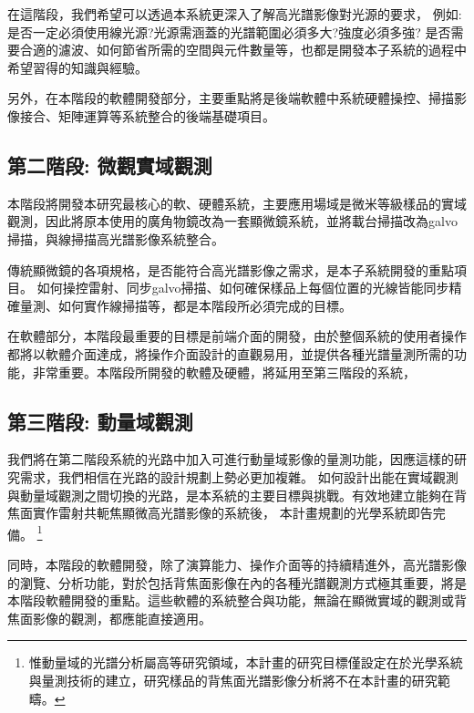 \documentclass[12pt]{article}
\begin{document}
在這階段，我們希望可以透過本系統更深入了解高光譜影像對光源的要求，
例如: 是否一定必須使用線光源?光源需涵蓋的光譜範圍必須多大?強度必須多強?
是否需要合適的濾波、如何節省所需的空間與元件數量等，也都是開發本子系統的過程中希望習得的知識與經驗。

另外，在本階段的軟體開發部分，主要重點將是後端軟體中系統硬體操控、掃描影像接合、矩陣運算等系統整合的後端基礎項目。
\subsection{第二階段: 微觀實域觀測} \label{microreal}
本階段將開發本研究最核心的軟、硬體系統，主要應用場域是微米等級樣品的實域觀測，因此將原本使用的廣角物鏡改為一套顯微鏡系統，並將載台掃描改為galvo掃描，與線掃描高光譜影像系統整合。

傳統顯微鏡的各項規格，是否能符合高光譜影像之需求，是本子系統開發的重點項目。
如何操控雷射、同步galvo掃描、如何確保樣品上每個位置的光線皆能同步精確量測、如何實作線掃描等，都是本階段所必須完成的目標。

在軟體部分，本階段最重要的目標是前端介面的開發，由於整個系統的使用者操作都將以軟體介面達成，將操作介面設計的直觀易用，並提供各種光譜量測所需的功能，非常重要。本階段所開發的軟體及硬體，將延用至第三階段的系統，

\subsection{第三階段: 動量域觀測} \label{momentum}
我們將在第二階段系統的光路中加入可進行動量域影像的量測功能，因應這樣的研究需求，我們相信在光路的設計規劃上勢必更加複雜。
如何設計出能在實域觀測與動量域觀測之間切換的光路，是本系統的主要目標與挑戰。有效地建立能夠在背焦面實作雷射共軛焦顯微高光譜影像的系統後，
本計畫規劃的光學系統即告完備。
\footnote{惟動量域的光譜分析屬高等研究領域，本計畫的研究目標僅設定在於光學系統與量測技術的建立，研究樣品的背焦面光譜影像分析將不在本計畫的研究範疇。}

同時，本階段的軟體開發，除了演算能力、操作介面等的持續精進外，高光譜影像的瀏覽、分析功能，對於包括背焦面影像在內的各種光譜觀測方式極其重要，將是本階段軟體開發的重點。這些軟體的系統整合與功能，無論在顯微實域的觀測或背焦面影像的觀測，都應能直接適用。
\end{document}
